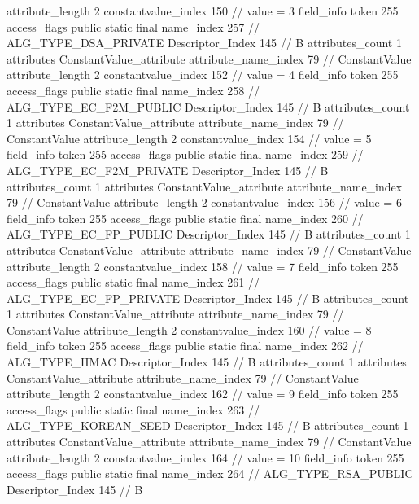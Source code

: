 {{{{{{{					attribute_length	2
					constantvalue_index	150		// value = 3
				}
				}
			}
			field_info {
				token	255
				access_flags	public static final
				name_index	257		// ALG_TYPE_DSA_PRIVATE
				Descriptor_Index	145		// B
				attributes_count	1
				attributes {
				ConstantValue_attribute {
					attribute_name_index	79		// ConstantValue
					attribute_length	2
					constantvalue_index	152		// value = 4
				}
				}
			}
			field_info {
				token	255
				access_flags	public static final
				name_index	258		// ALG_TYPE_EC_F2M_PUBLIC
				Descriptor_Index	145		// B
				attributes_count	1
				attributes {
				ConstantValue_attribute {
					attribute_name_index	79		// ConstantValue
					attribute_length	2
					constantvalue_index	154		// value = 5
				}
				}
			}
			field_info {
				token	255
				access_flags	public static final
				name_index	259		// ALG_TYPE_EC_F2M_PRIVATE
				Descriptor_Index	145		// B
				attributes_count	1
				attributes {
				ConstantValue_attribute {
					attribute_name_index	79		// ConstantValue
					attribute_length	2
					constantvalue_index	156		// value = 6
				}
				}
			}
			field_info {
				token	255
				access_flags	public static final
				name_index	260		// ALG_TYPE_EC_FP_PUBLIC
				Descriptor_Index	145		// B
				attributes_count	1
				attributes {
				ConstantValue_attribute {
					attribute_name_index	79		// ConstantValue
					attribute_length	2
					constantvalue_index	158		// value = 7
				}
				}
			}
			field_info {
				token	255
				access_flags	public static final
				name_index	261		// ALG_TYPE_EC_FP_PRIVATE
				Descriptor_Index	145		// B
				attributes_count	1
				attributes {
				ConstantValue_attribute {
					attribute_name_index	79		// ConstantValue
					attribute_length	2
					constantvalue_index	160		// value = 8
				}
				}
			}
			field_info {
				token	255
				access_flags	public static final
				name_index	262		// ALG_TYPE_HMAC
				Descriptor_Index	145		// B
				attributes_count	1
				attributes {
				ConstantValue_attribute {
					attribute_name_index	79		// ConstantValue
					attribute_length	2
					constantvalue_index	162		// value = 9
				}
				}
			}
			field_info {
				token	255
				access_flags	public static final
				name_index	263		// ALG_TYPE_KOREAN_SEED
				Descriptor_Index	145		// B
				attributes_count	1
				attributes {
				ConstantValue_attribute {
					attribute_name_index	79		// ConstantValue
					attribute_length	2
					constantvalue_index	164		// value = 10
				}
				}
			}
			field_info {
				token	255
				access_flags	public static final
				name_index	264		// ALG_TYPE_RSA_PUBLIC
				Descriptor_Index	145		// B
}}}}}
